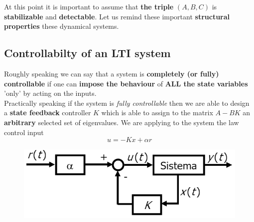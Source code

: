 At this point it is important to assume that \textbf{the triple} $(A, B, C)$ is \textbf{stabilizable} and \textbf{detectable}. 
Let us remind these important \textbf{structural properties} these dynamical systems.

\subsection{Controllabilty of an LTI system}
Roughly speaking we can say that a system is \textbf{completely (or fully) controllable} if one can \textbf{impose the behaviour} of \textbf{ALL the state variables} 'only' by acting on the inputs.  \\
Practically speaking if the system is \textit{fully controllable} then we are able to design a \textbf{state feedback} controller $K$ which is able to assign to the matrix $A-BK$ an \textbf{arbitrary} selected set of eigenvalues. We are applying to the system the law control input
\begin{equation}
    u=-Kx+\alpha r
\end{equation}

\begin{figure}[h]
    \centering
    \includegraphics[scale=0.8]{images/state_feedback.png}
\end{figure}

\hspace*{-5mm}
%

